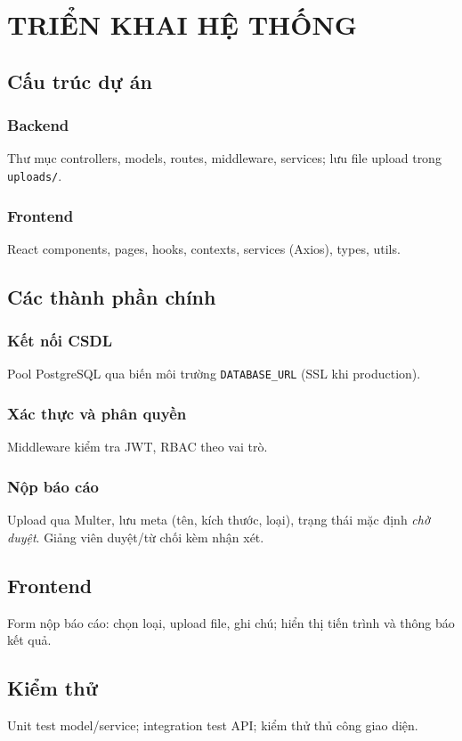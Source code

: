 \chapter{TRIỂN KHAI HỆ THỐNG}

\section{Cấu trúc dự án}
\subsection{Backend}
Thư mục controllers, models, routes, middleware, services; lưu file upload trong \texttt{uploads/}.

\subsection{Frontend}
React components, pages, hooks, contexts, services (Axios), types, utils.

\section{Các thành phần chính}
\subsection{Kết nối CSDL}
Pool PostgreSQL qua biến môi trường \texttt{DATABASE\_URL} (SSL khi production).

\subsection{Xác thực và phân quyền}
Middleware kiểm tra JWT, RBAC theo vai trò.

\subsection{Nộp báo cáo}
Upload qua Multer, lưu meta (tên, kích thước, loại), trạng thái mặc định \textit{chờ duyệt}. Giảng viên duyệt/từ chối kèm nhận xét.

\section{Frontend}
Form nộp báo cáo: chọn loại, upload file, ghi chú; hiển thị tiến trình và thông báo kết quả.

\section{Kiểm thử}
Unit test model/service; integration test API; kiểm thử thủ công giao diện.
